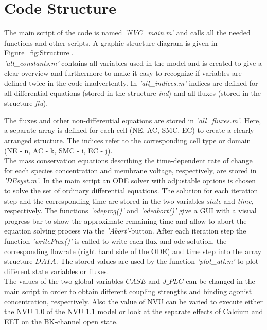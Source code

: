 \section{Code Structure}

The main script of the code is named \textit{'NVC\_main.m'} and calls all the needed functions and other scripts. A graphic structure diagram is given in Figure~\ref{fig:Structure}.\\
\textit{'all\_constants.m'} contains all variables used in the model and is created to give a clear overview and  furthermore to make it easy to recognize if variables are defined twice in the code inadvertently. In \textit{'all\_indices.m'} indices are defined for all differential equations (stored in the structure \textit{ind}) and all fluxes (stored in the structure \textit{flu}). 

The fluxes and other non-differential equations are stored in \textit{'all\_fluxes.m'}. Here, a separate array is defined for each cell (NE, AC, SMC, EC) to create a clearly arranged structure. The indices refer to the corresponding cell type or domain (NE - n, AC - k, SMC - i, EC - j).\\
The mass conservation equations describing the time-dependent rate of change for each species concentration and membrane voltage, respectively, are stored in \textit{'DEsyst.m'}. In the main script an ODE solver with adjustable options is chosen to solve the set of ordinary differential equations. The  solution for each iteration step and the corresponding time are stored in the two variables \textit{state} and \textit{time}, respectively.  The functions \textit{'odeprog()'} and \textit{'odeabort()'}  \cite{Franklin} give a GUI  with a visual progress bar to show the approximate remaining time and allow to abort the equation solving process via the \textit{'Abort'}-button. After each iteration step the function \textit{'writeFlux()'} is called to write each flux and ode solution, the corresponding flowrate (right hand side of the ODE) and time step into the array structure $DATA $. The stored values are used by the function \textit{ 'plot\_all.m'} to plot different state variables or fluxes. \\
The values of the two global variables $ CASE $ and $ J\_PLC $ can be changed in the main script in order to obtain different coupling strengths and binding agonist concentration, respectively. Also the value of NVU can be varied to execute either the NVU 1.0 of the NVU 1.1 model or look at the separate effects of Calcium and EET on the BK-channel open state.


